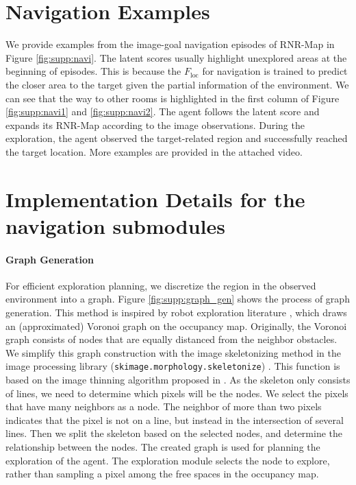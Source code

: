 \documentclass[10pt,twocolumn,letterpaper]{article}
\begin{document}
\section{Navigation Examples}\label{appendix:navi}
We provide examples from the image-goal navigation episodes of RNR-Map in Figure \ref{fig:supp:navi}.
%
The latent scores usually highlight unexplored areas at the beginning of episodes.
%
This is because the $F_\mathrm{loc}$ for navigation is trained to predict the closer area to the target given the partial information of the environment.
%
We can see that the way to other rooms is highlighted in the first column of Figure \ref{fig:supp:navi1} and \ref{fig:supp:navi2}.
%
The agent follows the latent score and expands its RNR-Map according to the image observations.
%
During the exploration, the agent observed the target-related region and successfully reached the target location.
%
More examples are provided in the attached video.



\section{Implementation Details for the navigation submodules} \label{appendix:impd_navi}
\paragraph{Graph Generation}
%
For efficient exploration planning, we discretize the region in the observed environment into a graph.
%
Figure \ref{fig:supp:graph_gen} shows the process of graph generation.
%
This method is inspired by robot exploration literature \cite{gvg_10,gvg_14,gvg_20,gvg_99}, which draws an (approximated) Voronoi graph on the occupancy map.
%
Originally, the Voronoi graph consists of nodes that are equally distanced from the neighbor obstacles.
%
We simplify this graph construction with the image skeletonizing method in the image processing library (\texttt{skimage.morphology.skeletonize}) \cite{van2014scikit}.
%
This function is based on the image thinning algorithm proposed in \cite{thinning}.
%
As the skeleton only consists of lines, we need to determine which pixels will be the nodes.
%
We select the pixels that have many neighbors as a node.
%
The neighbor of more than two pixels indicates that the pixel is not on a line, but instead in the intersection of several lines.
%
Then we split the skeleton based on the selected nodes, and determine the relationship between the nodes.
%
The created graph is used for planning the exploration of the agent.
%
The exploration module selects the node to explore, rather than sampling a pixel among the free spaces in the occupancy map.
\end{document}

